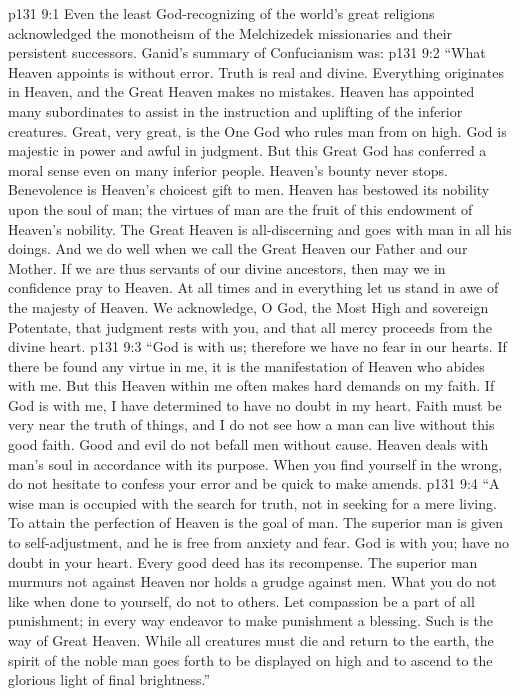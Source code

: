 \vs p131 9:1 Even the least God\hyp{}recognizing of the world’s great religions acknowledged the monotheism of the Melchizedek missionaries and their persistent successors. Ganid’s summary of Confucianism was:
\vs p131 9:2 \pc “What Heaven appoints is without error. Truth is real and divine. Everything originates in Heaven, and the Great Heaven makes no mistakes. Heaven has appointed many subordinates to assist in the instruction and uplifting of the inferior creatures. Great, very great, is the One God who rules man from on high. God is majestic in power and awful in judgment. But this Great God has conferred a moral sense even on many inferior people. Heaven’s bounty never stops. Benevolence is Heaven’s choicest gift to men. Heaven has bestowed its nobility upon the soul of man; the virtues of man are the fruit of this endowment of Heaven’s nobility. The Great Heaven is all\hyp{}discerning and goes with man in all his doings. And we do well when we call the Great Heaven our Father and our Mother. If we are thus servants of our divine ancestors, then may we in confidence pray to Heaven. At all times and in everything let us stand in awe of the majesty of Heaven. We acknowledge, O God, the Most High and sovereign Potentate, that judgment rests with you, and that all mercy proceeds from the divine heart.
\vs p131 9:3 “God is with us; therefore we have no fear in our hearts. If there be found any virtue in me, it is the manifestation of Heaven who abides with me. But this Heaven within me often makes hard demands on my faith. If God is with me, I have determined to have no doubt in my heart. Faith must be very near the truth of things, and I do not see how a man can live without this good faith. Good and evil do not befall men without cause. Heaven deals with man’s soul in accordance with its purpose. When you find yourself in the wrong, do not hesitate to confess your error and be quick to make amends.
\vs p131 9:4 “A wise man is occupied with the search for truth, not in seeking for a mere living. To attain the perfection of Heaven is the goal of man. The superior man is given to self\hyp{}adjustment, and he is free from anxiety and fear. God is with you; have no doubt in your heart. Every good deed has its recompense. The superior man murmurs not against Heaven nor holds a grudge against men. What you do not like when done to yourself, do not to others. Let compassion be a part of all punishment; in every way endeavor to make punishment a blessing. Such is the way of Great Heaven. While all creatures must die and return to the earth, the spirit of the noble man goes forth to be displayed on high and to ascend to the glorious light of final brightness.”

